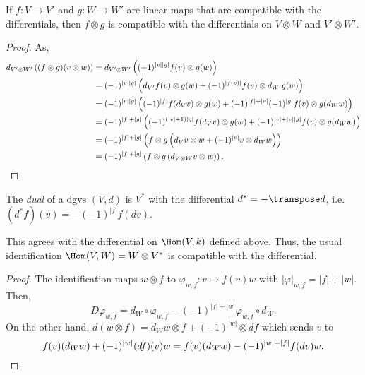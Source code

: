 \documentclass[english,no-theorem-numbers]{short-notes}
\newcommand\degree[1]{|#1|}
\renewcommand\dual{*}
\begin{document}
\begin{Prop}
    If $f\colon V → V'$ and $g\colon W → W'$ are linear maps that are compatible with the differentials, then $f \otimes g$ is compatible with the differentials on $V\otimes W$ and $V' \otimes W'$.
\end{Prop}
\begin{proof}
    As,
    \begin{align*}
    d_{V'\otimes W'}\left( (f\otimes g)(v \otimes w) \right)  & =
    d_{V'\otimes W'}\left( (-1)^{\degree v \degree g}f(v) \otimes g(w) \right) \\ & =
    (-1)^{\degree v \degree g} \left( d_{V'}f(v) \otimes g(w) + (-1)^{\degree{f(v)}} f(v) \otimes d_{W'} g(w) \right)\\ &  = 
    (-1)^{\degree v \degree g} \left( (-1)^{\degree f}f(d_Vv) \otimes g(w) + (-1)^{\degree{f} + \degree{v}}(-1)^{\degree g} f(v) \otimes g(d_Ww) \right)\\ &  = 
    (-1)^{\degree f + \degree g} \left( (-1)^{(\degree v + 1)\degree g} f(d_Vv) \otimes g(w) + (-1)^{\degree v + \degree v \degree g} f(v) \otimes g(d_Ww) \right)\\ &  =
    (-1)^{\degree f + \degree g} \left( f\otimes g \left( d_Vv \otimes w + (-1)^{\degree v} v \otimes d_Ww \right) \right)\\ &  =
    (-1)^{\degree f + \degree g} \left( f\otimes g \left( d_{V\otimes W} v \otimes w \right) \right).
    \qedhere
    \end{align*}%
\end{proof}

\begin{Def}[Dual]
The \emph{dual} of a dgvs $(V,d)$ is $V^\dual$ with the differential $d^\dual = - \transpose d$, i.e.\ $(d^\dual f)(v) = - (-1)^{\degree f} f(dv)$.
\end{Def}

\begin{Prop}
    This agrees with the differential on $\Hom(V,k)$ defined above.
    Thus, the usual identification $\Hom(V,W) = W \otimes V^\dual$ is compatible with the differential.
\end{Prop}
\begin{proof}
    The identification maps $w \otimes f$ to $φ_{w,f}\colon v \mapsto f(v)w$ with $\degree φ_{w,f} = \degree f + \degree w$.
    Then,
    \[
    Dφ_{w,f} = d_W ∘ φ_{w,f} - (-1)^{\degree f + \degree w} φ_{w,f} ∘ d_W.
    \]
    On the other hand, $d(w \otimes f) = d_Ww \otimes f + (-1)^{\degree w} \otimes df$ which sends $v$ to
    \[
    f(v)(d_Ww) + (-1)^{\degree w}(df)(v)w =
    f(v)(d_Ww) - (-1)^{\degree w + \degree f}f(dv)w.
    \qedhere
    \]%
\end{proof}%
\end{document}
